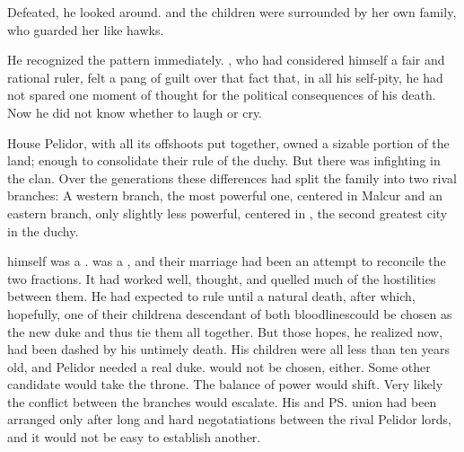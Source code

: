 \begin{comment}
\section{The Pelidor schism}
\end{comment}

Defeated, he looked around. 
\Tiroco{} and the children were surrounded by her own family, who guarded her like hawks. 

He recognized the pattern immediately. 
\Icor, who had considered himself a fair and rational ruler, felt a pang of guilt over that fact that, in all his self-pity, he had not spared one moment of thought for the political consequences of his death. 
Now he did not know whether to laugh or cry. 

House Pelidor, with all its offshoots put together, owned a sizable portion of the land; enough to consolidate their rule of the duchy. 
But there was infighting in the clan. 
Over the generations these differences had split the family into two rival branches: 
A western branch, the most powerful one, centered in Malcur and an eastern branch, only slightly less powerful, centered in \Forklin, the second greatest city in the duchy. 

\Icor{} himself was a \Malcurian{}. 
\Tiroco{} was a \Forkliner, and their marriage had been an attempt to reconcile the two fractions. 
It had worked well, \Icor{} thought, and quelled much of the hostilities between them. 
He had expected to rule until a natural death, after which, hopefully, one of their children\dash a descendant of both bloodlines\dash could be chosen as the new duke and thus tie them all together. 
But those hopes, he realized now, had been dashed by his untimely death. 
His children were all less than ten years old, and Pelidor needed a real duke. 
\Tiroco{} would not be chosen, either. 
Some other candidate would take the throne. 
The balance of power would shift. 
Very likely the conflict between the branches would escalate. 
His and \ps{\Tiroco}{} union had been arranged only after long and hard negotatiations between the rival Pelidor lords, and it would not be easy to establish another. 

